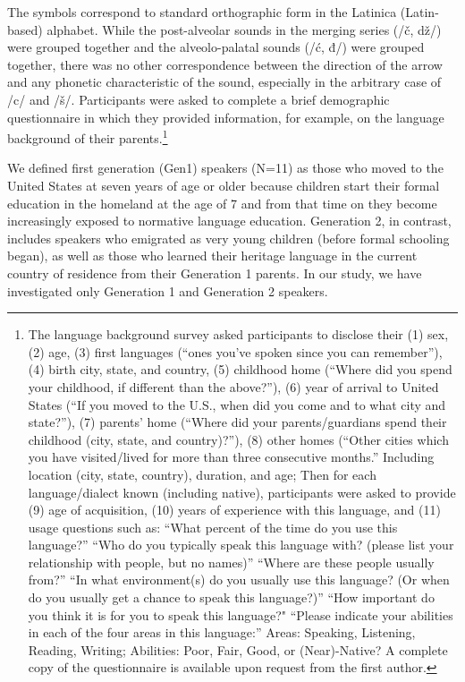 \documentclass[output=paper,modfonts,nonflat,
]{langsci/langscibook}
\begin{document}
The symbols correspond to standard orthographic form in the Latinica (Latin-based) alphabet. While the post-alveolar sounds in the merging series (/č, dž/) were grouped together and the alveolo-palatal sounds (/ć, đ/) were grouped together, there was no other correspondence between the direction of the arrow and any phonetic characteristic of the sound, especially in the arbitrary case of /c/ and /š/. Participants were asked to complete a brief demographic questionnaire in which they provided information, for example, on the language background of their parents.\footnote{The language background survey asked participants to disclose their 
(1) sex, 
(2) age, 
(3) first languages (“ones you’ve spoken since you can remember”), 
(4) birth city, state, and country,
(5) childhood home (“Where did you spend your childhood, if different than the above?”), 
(6) year of arrival to United States (“If you moved to the U.S., when did you come and to what city and state?”), 
(7) parents’ home (“Where did your parents/guardians spend their childhood (city, state, and country)?”),
(8) other homes (“Other cities which you have visited/lived for more than three consecutive months.” Including location (city, state, country), duration, and age;                  Then for each language/dialect known (including native), participants were asked to provide 
(9) age of acquisition, 
(10) years of experience with this language, and 
(11) usage questions such as:          
  “What percent of the time do you use this language?”    
  “Who do you typically speak this language with? (please list your     relationship with people, but no names)”        “Where are these people usually from?”         
  “In what environment(s) do you usually use this language? (Or when do     you usually get a chance to speak this language?)”     
  “How important do you think it is for you to speak this language?" 
  “Please indicate your abilities in each of the four areas in this language:” Areas: Speaking, Listening, Reading, Writing; Abilities: Poor, Fair, Good, or (Near)-Native?  
  A complete copy of the questionnaire is available upon request from the first author.}



We defined first generation (Gen1) speakers (N=11) as those who moved to the United States at seven years of age or older because children start their formal education in the homeland at the age of 7 and from that time on they become increasingly exposed to normative language education. Generation 2, in contrast, includes speakers who emigrated as very young children (before formal schooling began), as well as those who learned their heritage language in the current country of residence from their Generation 1 parents. In our study, we have investigated only Generation 1 and Generation 2 speakers.
\end{document}
